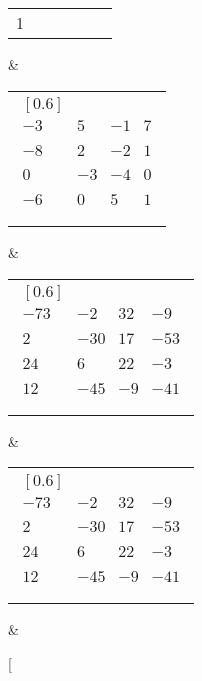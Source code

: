 \begin{table}[ht!]
{\begin{tabular}{||c|c|c|c|c|c||}
			1 & \begin{tabular}[c]{@{}l@{}}$\begin{matrix}[0.6] \\ -3 & 5 & -1 & 7 \\\\ -8 & 2 & -2 & 1 \\\\ 0 & -3 & -4 & 0 \\\\ -6 & 0 & 5 & 1 \\\\ \end{matrix}$\end{tabular} & \begin{tabular}[c]{@{}l@{}}$\begin{matrix}[0.6] \\ -3 & 5 & -1 & 7 \\\\ -8 & 2 & -2 & 1 \\\\ 0 & -3 & -4 & 0 \\\\ -6 & 0 & 5 & 1 \\\\ \end{matrix}$\end{tabular} & \begin{tabular}[c]{@{}l@{}}$\begin{matrix}[0.6] \\ -73 & -2 & 32 & -9 \\\\ 2 & -30 & 17 & -53 \\\\ 24 & 6 & 22 & -3 \\\\ 12 & -45 & -9 & -41 \\\\ \end{matrix}$\end{tabular} & \begin{tabular}[c]{@{}l@{}}$\begin{matrix}[0.6] \\ -73 & -2 & 32 & -9 \\\\ 2 & -30 & 17 & -53 \\\\ 24 & 6 & 22 & -3 \\\\ 12 & -45 & -9 & -41 \\\\ \end{matrix}$\end{tabular} & \begin{tabular}[
\end{tabular}}
\end{table}
